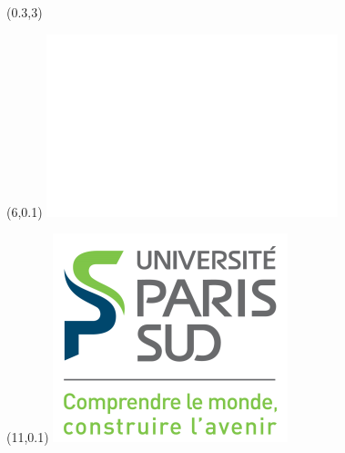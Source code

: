 \documentclass[a4paper]{article}
\newcommand{\vpos}{0.1}																	%
\newcommand{\hpos}{11}																		%
\newcommand{\vpostt}{0.1} 																	%
\newcommand{\hpostt}{6}																	%
\begin{document}
	
	
	\begin{textblock}{1}(0.3,3)
		\Large{}
	\end{textblock}
	
	
	
	
	\begin{textblock}{1}(\hpostt,\vpostt)
		\includegraphics[scale=1]{media/etab/blank.png}
	\end{textblock}
	
	\begin{textblock}{1}(\hpos,\vpos)
		\includegraphics[scale=1]{media/etab/UPSUD.png}	
	\end{textblock}
	
\end{document}
